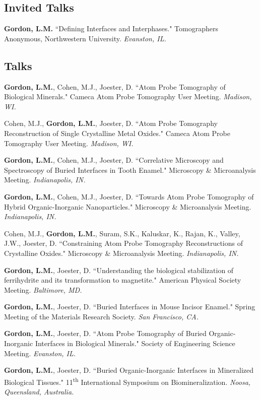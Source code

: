 \subsection*{Invited Talks}
\textbf{Gordon, L.M.} ``Defining Interfaces and Interphases." Tomographers Anonymous, Northwestern University. \emph{Evanston, IL.}

\subsection*{Talks}
\textbf{Gordon, L.M.}, Cohen, M.J., Joester, D. ``Atom Probe Tomography of Biological Minerals." Cameca Atom Probe Tomography User Meeting. \emph{Madison, WI.}
\begingroup\setlength{\parskip}{0.15cm}

Cohen, M.J., \textbf{Gordon, L.M.}, Joester, D. ``Atom Probe Tomography Reconstruction of 
Single Crystalline Metal Oxides." Cameca Atom Probe Tomography User Meeting. \emph{Madison, WI.}

\textbf{Gordon, L.M.}, Cohen, M.J., Joester, D. ``Correlative Microscopy and Spectroscopy of Buried Interfaces in Tooth Enamel." Microscopy \& Microanalysis Meeting. \emph{Indianapolis, IN.}

\textbf{Gordon, L.M.}, Cohen, M.J., Joester, D. ``Towards Atom Probe Tomography of Hybrid Organic-Inorganic Nanoparticles." Microscopy \& Microanalysis Meeting. \emph{Indianapolis, IN.}

Cohen, M.J., \textbf{Gordon, L.M.}, Suram, S.K., Kaluskar, K., Rajan, K., Valley, J.W., Joester, D. ``Constraining Atom Probe Tomography Reconstructions of Crystalline Oxides." Microscopy \& Microanalysis Meeting. \emph{Indianapolis, IN.}

\textbf{Gordon, L.M.}, Joester, D. ``Understanding the biological stabilization of ferrihydrite and its transformation to magnetite." American Physical Society Meeting. \emph{Baltimore, MD.}

\textbf{Gordon, L.M.}, Joester, D. ``Buried Interfaces in Mouse Incisor Enamel." Spring Meeting of the Materials Research Society. \emph{San Francisco, CA.}

\textbf{Gordon, L.M.}, Joester, D. ``Atom Probe Tomography of Buried Organic-Inorganic Interfaces in Biological Minerals." Society of Engineering Science Meeting. \emph{Evanston, IL.}

\textbf{Gordon, L.M.}, Joester, D. ``Buried Organic-Inorganic Interfaces in Mineralized Biological Tissues." 11\textsuperscript{th} International Symposium on Biomineralization. \emph{Noosa, Queensland, Australia.}

